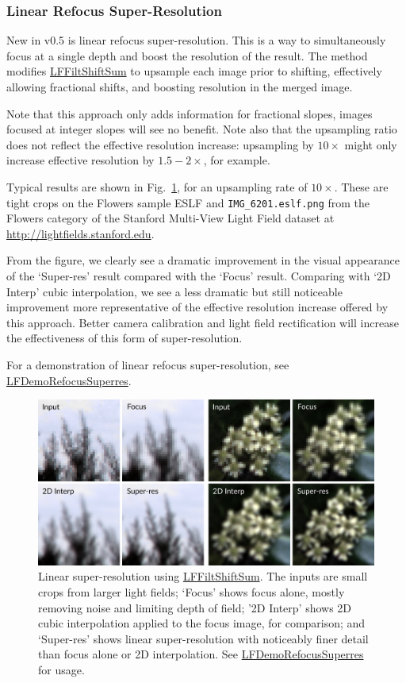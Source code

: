 \documentclass[onecolumn]{article}
\newcommand{\CiteFunc}[1]{\hyperlink{#1}{\small #1}}
\newcommand{\SymbolText}[1]{\texttt{\small #1}}
\begin{document}
\subsubsection{Linear Refocus Super-Resolution}
\label{sect_SuperResTour}
New in v0.5 is linear refocus super-resolution. This is a way to simultaneously focus at a single depth and boost the resolution of the result. The method modifies \CiteFunc{LFFiltShiftSum} to upsample each image prior to shifting, effectively allowing fractional shifts, and boosting resolution in the merged image. 

Note that this approach only adds information for fractional slopes, images focused at integer slopes will see no benefit. Note also that the upsampling ratio does not reflect the effective resolution increase: upsampling by $10 \times$ might only increase effective resolution by $1.5 - 2 \times$, for example.

Typical results are shown in Fig.~\ref{fig_RefocusSuperResolution}, for an upsampling rate of $10 \times$. These are tight crops on the Flowers sample ESLF and \SymbolText{IMG\_6201.eslf.png} from the Flowers category of the Stanford Multi-View Light Field dataset at \url{http://lightfields.stanford.edu}.

From the figure, we clearly see a dramatic improvement in the visual appearance of the `Super-res' result compared with the `Focus' result. Comparing with `2D Interp' cubic interpolation, we see a less dramatic but still noticeable improvement more representative of the effective resolution increase offered by this approach. Better camera calibration and light field rectification will increase the effectiveness of this form of super-resolution.

For a demonstration of linear refocus super-resolution, see \CiteFunc{LFDemoRefocusSuperres}.

\begin{figure}[tbh]
	\centering
	\includegraphics[width=1\textwidth]{Figs/RefocusSuperRes}
	\caption{Linear super-resolution using \protect\CiteFunc{LFFiltShiftSum}. The inputs are small crops from larger light fields; `Focus' shows focus alone, mostly removing noise and limiting depth of field; '2D Interp' shows 2D cubic interpolation applied to the focus image, for comparison; and `Super-res' shows linear super-resolution with noticeably finer detail than focus alone or 2D interpolation. See \protect\CiteFunc{LFDemoRefocusSuperres} for usage.}
	\label{fig_RefocusSuperResolution}
\end{figure}
\end{document}
